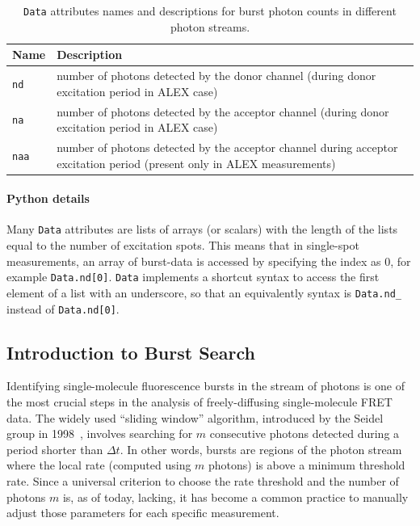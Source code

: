 \documentclass[10pt,letterpaper]{article}
\begin{document}
\begin{table}
\begin{tabular}{l p{}}
  Name  & Description \\
  \hline
  \verb|nd| & number of photons detected by the donor channel (during donor excitation period in ALEX case)\\
  \verb|na| & number of photons detected by the acceptor channel (during donor excitation period in ALEX case)\\
  \verb|naa| & number of photons detected by the acceptor channel during acceptor excitation period (present only in ALEX measurements)\\
\end{tabular}
\caption{\label{tab:data_n}\texttt{Data} attributes names and descriptions for burst photon counts in different photon streams.}
\end{table}


\paragraph*{Python details}
Many \verb|Data| attributes are lists of arrays (or scalars) with the length of the lists
equal to the number of excitation spots. This means that in
single-spot measurements, an array of burst-data
is accessed by specifying the index as 0, for example \verb|Data.nd[0]|.
\verb|Data| implements a shortcut syntax to access the first element of a list
with an underscore, so that an equivalently syntax is
\verb|Data.nd_| instead of \verb|Data.nd[0]|.

\subsection*{Introduction to Burst Search}
\label{sec:burstsearch_intro}

Identifying single-molecule fluorescence bursts in the stream of photons is
one of the most crucial steps in the analysis of freely-diffusing single-molecule FRET data.
The widely used ``sliding window'' algorithm, introduced by the Seidel group in
1998~\cite{Eggeling_1998,Fries_1998}, involves searching for
$m$ consecutive photons detected during a period shorter than
$\Delta t$. In other words, bursts are regions of the photon stream where the
local rate (computed using $m$ photons) is above a minimum threshold rate.
Since a universal criterion to choose the rate threshold and
the number of photons $m$ is, as of today, lacking, it has become a common
practice to manually adjust those parameters for each specific measurement.
\end{document}
